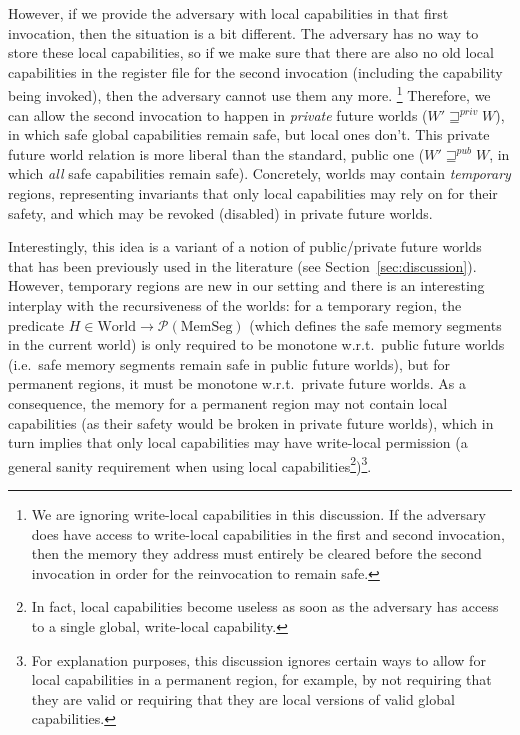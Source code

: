 \documentclass[format=acmsmall, review=true, screen=true]{acmart}
\renewcommand{\sectionname}{Section}
\newcommand{\powerset}[1]{\mathcal{P}(#1)}
\newcommand{\var}[1]{\mathit{#1}}
\newcommand{\futurewk}{\mathbin{\sqsupseteq}^{\var{pub}}}
\newcommand{\futurestr}{\mathbin{\sqsupseteq}^{\var{priv}}}
\newcommand{\plaindom}[1]{\mathrm{#1}}
\newcommand{\HeapSegments}{\plaindom{MemSeg}}
\newcommand{\MemSegments}{\HeapSegments}
\newcommand{\Worlds}{\plaindom{World}}
\newenvironment{toplas}{}{}
\begin{document}
\begin{toplas}
However, if we provide the adversary with local capabilities in that first
invocation, then the situation is a bit different. The adversary has no way to
store these local capabilities, so if we make sure that there are also no old
local capabilities in the register file for the second invocation (including the
capability being invoked), then the adversary cannot use them any more.%
\footnote{We are ignoring write-local capabilities in this discussion. If the
  adversary does have access to write-local capabilities in the first and second
  invocation, then the memory they address must entirely be cleared before the
  second invocation in order for the reinvocation to remain safe.} Therefore, we
can allow the second invocation to happen in \emph{private} future worlds ($W'
\futurestr W$), in which safe global capabilities remain safe, but local ones
don't. This private future world relation is more liberal than the standard,
public one ($W' \futurewk W$, in which \emph{all} safe capabilities remain
safe). Concretely, worlds may contain \emph{temporary} regions, representing
invariants that only local capabilities may rely on for their safety, and which
may be revoked (disabled) in private future worlds.

Interestingly, this idea is a variant of a notion of public/private future
worlds that has been previously used in the literature (see
\sectionname~\ref{sec:discussion}). However, temporary regions are new in our setting
and there is an interesting interplay with the recursiveness of the worlds: for
a temporary region, the predicate $H \in \Worlds \rightarrow
\powerset{\MemSegments}$ (which defines the safe memory segments in the
current world) is only required to be monotone w.r.t.\ public
future worlds (i.e.\ safe memory segments remain safe in public future worlds),
but for permanent regions, it must be monotone w.r.t.\ private future worlds.
As a consequence, the memory for a permanent region may not contain local
capabilities (as their safety would be broken in private future worlds), which
in turn implies that only local capabilities may have write-local permission (a
general sanity requirement when using local capabilities\footnote{In fact, local
  capabilities become useless as soon as the adversary has access to a single
  global, write-local capability.})\footnote{For explanation purposes, this
  discussion ignores certain ways to allow for local capabilities in a permanent
  region, for example, by not requiring that they are valid or requiring that
  they are local versions of valid global capabilities.}.
\end{toplas}
\end{document}
